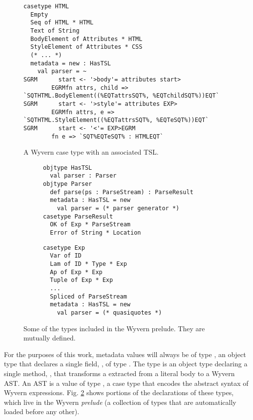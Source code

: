 \begin{figure}[t]
\begin{lstlisting}[escapechar=$]
casetype HTML 
  Empty
  Seq of HTML * HTML 
  Text of String
  BodyElement of Attributes * HTML
  StyleElement of Attributes * CSS
  (* ... *)
  metadata = new : HasTSL
    val parser = ~
SGRM      start <- '>body'= attributes start>
        EGRMfn attrs, child => `SQTHTML.BodyElement((%EQTattrsSQT%, %EQTchildSQT%))EQT`
SGRM      start <- '>style'= attributes EXP>
        EGRMfn attrs, e => `SQTHTML.StyleElement((%EQTattrsSQT%, %EQTeSQT%))EQT`
SGRM      start <- '<'= EXP>EGRM 
        fn e => `SQT%EQTeSQT% : HTMLEQT`
\end{lstlisting}
\caption{A Wyvern case type with an associated TSL.}
\label{f-htmltype}
\end{figure}
\begin{figure}[t]
\begin{subfigure}[t]{.58\textwidth}
\begin{lstlisting}
objtype HasTSL
  val parser : Parser
objtype Parser                          
  def parse(ps : ParseStream) : ParseResult
  metadata : HasTSL = new
    val parser = (* parser generator *)
casetype ParseResult
  OK of Exp * ParseStream
  Error of String * Location  
\end{lstlisting}
\end{subfigure}
\begin{subfigure}[t]{.42\textwidth}
\begin{lstlisting}[linewidth=.42\textwidth,firstnumber=10]
casetype Exp 
  Var of ID
  Lam of ID * Type * Exp
  Ap of Exp * Exp
  Tuple of Exp * Exp
  ... 
  Spliced of ParseStream
  metadata : HasTSL = new
    val parser = (* quasiquotes *)
\end{lstlisting}
\end{subfigure}
\caption{Some of the types included in the Wyvern prelude. They are mutually defined.}
\label{f-builtins}
\end{figure}

For the purposes of this work, metadata values will always be of type , an object type that declares a single field, , of type . The  type is an object type declaring a single method, , that transforms a  extracted from a literal body to a Wyvern AST. An AST is a value of type , a case type that encodes the abstract syntax of Wyvern expressions. Fig. \ref{f-builtins} shows portions of the declarations of these types, which live in the Wyvern \emph{prelude} (a collection of types that are automatically loaded before any other).

